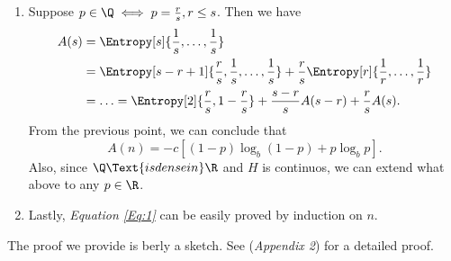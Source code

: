 \documentclass{subfiles}
\begin{document}
\begin{proof*}
\begin{enumerate}
            \item Suppose \(p \in \Q \iff p = \tfrac{r}{s}, r \le s\).
                Then we have 
                \[\begin{aligned}
                    A(s) & = \Entropy[s]{\frac{1}{s}, \ldots, \frac{1}{s}} \\ 
                        & = \Entropy[s - r + 1]{\frac{r}{s}, \frac{1}{s}, \ldots, \frac{1}{s}} 
                          + \frac{r}{s} \Entropy[r]{\frac{1}{r}, \ldots, \frac{1}{r}} \\ 
                        & = \ldots = \Entropy[2]{\frac{r}{s}, 1 - \frac{r}{s}}
                          + \frac{s - r}{s} A(s - r) + \frac{r}{s} A(s).
                \end{aligned}\]
                From the previous point, we can conclude that 
                \[
                    A(n) = -c \left\lbrack
                        (1 - p) \log_{b} (1 - p) + p \log_{b} p
                    \right\rbrack.
                \]
                Also, since \(\Q \Text{is dense in } \R\) and \(H\) is continuos,
                we can extend what above to any \(p \in \R\).

            \item Lastly, \emph{Equation \eqref{Eq:1}} can be easily proved by 
                induction on \(n\).

        \end{enumerate}
    \end{proof*}
    The proof we provide is berly a sketch.
    See \cite{ShannonEntropy} (\emph{Appendix 2}) for a detailed proof.
\end{document}

